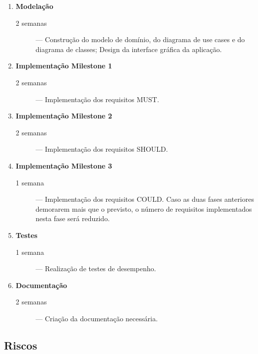 \documentclass{article}
\begin{document}
    \begin{enumerate}
      \item \textbf{Modelação} \hfill
        \begin{description}
          \item[2 semanas] --- Construção do modelo de domínio, do diagrama de use cases e do diagrama de classes; Design da interface gráfica da aplicação.
        \end{description}
      \item \textbf{Implementação Milestone 1}\hfill
        \begin{description}
          \item[2 semanas] --- Implementação dos requisitos MUST.
        \end{description}
      \item \textbf{Implementação Milestone 2}\hfill
        \begin{description}
          \item[2 semanas] --- Implementação dos requisitos SHOULD.
        \end{description}
      \item \textbf{Implementação Milestone 3}\hfill
        \begin{description}
          \item[1 semana] --- Implementação dos requisitos COULD. Caso as duas fases anteriores demorarem mais que o previsto, o número de requisitos implementados nesta fase será reduzido.
        \end{description}
      \item \textbf{Testes}\hfill
        \begin{description}
          \item[1 semana] --- Realização de testes de desempenho.
        \end{description}
      \item \textbf{Documentação}\hfill
        \begin{description}
          \item[2 semanas] --- Criação da documentação necessária.
        \end{description}
          
    \end{enumerate}

  \subsection{Riscos}
\end{document}
